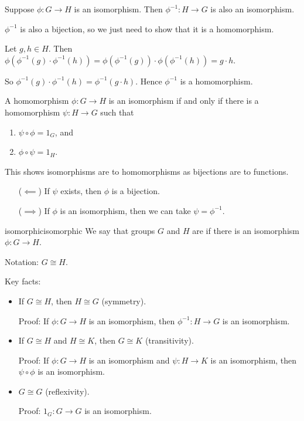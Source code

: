 \documentclass[12pt,letterpaper]{report}
\begin{document}
\begin{prop}{}{}
  Suppose $\phi \colon G \to H$ is an isomorphism.
  Then $\phi^{-1} : H \to G$ is also an isomorphism.
\end{prop}

\begin{thmproof}
  $\phi^{-1}$ is also a bijection, so we just need to show that it is a homomorphism.

  Let $g, h \in H$.
  Then $\phi(\phi^{-1}(g) \cdot \phi^{-1}(h)) = \phi(\phi^{-1}(g)) \cdot \phi(\phi^{-1}(h))
    = g \cdot h$.

  So $\phi^{-1}(g) \cdot \phi^{-1}(h) = \phi^{-1}(g \cdot h)$.
  Hence $\phi^{-1}$ is a homomorphism.
\end{thmproof}

\begin{cor}{}{}
  A homomorphism $\phi \colon G \to H$ is an isomorphism if and only if there is a homomorphism
  $\psi \colon H \to G$ such that
  \begin{enumerate}
    \item $\psi \circ \phi = 1_G$, and
    \item $\phi \circ \psi = 1_H$.
  \end{enumerate}
\end{cor}

This shows isomorphisms are to homomorphisms as bijections are to functions.

\begin{thmproof}
  \begin{enumerate}[leftmargin=4em]
    \item[($\impliedby$)] If $\psi$ exists, then $\phi$ is a bijection.
    \item[($\implies$)] If $\phi$ is an isomorphism, then we can take $\psi = \phi^{-1}$.
  \end{enumerate}
\end{thmproof}

\begin{defn}{isomorphic}{isomorphic}
  We say that groups $G$ and $H$ are  if there is an isomorphism
  $\phi \colon G \to H$.

  Notation: $G \cong H$.
\end{defn}

Key facts:
\begin{itemize}
  \item If $G \cong H$, then $H \cong G$ (symmetry).

  Proof: If $\phi \colon G \to H$ is an isomorphism, then $\phi^{-1} \colon H \to G$ is an
  isomorphism.
  \item If $G \cong H$ and $H \cong K$, then $G \cong K$ (transitivity).

  Proof: If $\phi \colon G \to H$ is an isomorphism and $\psi \colon H \to K$ is an isomorphism,
  then $\psi \circ \phi$ is an isomorphism.
  \item $G \cong G$ (reflexivity).

  Proof: $1_G \colon G \to G$ is an isomorphism.
\end{itemize}
\end{document}
